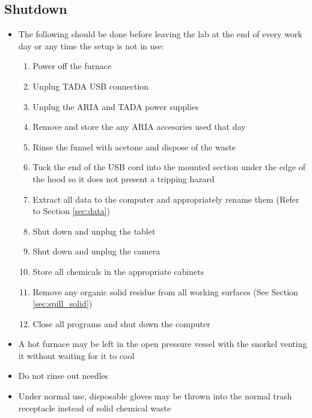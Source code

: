 \documentclass[letterpaper,11pt]{article}
\begin{document}
\subsection{Shutdown}
    \begin{itemize}
    \item The following should be done before leaving the lab at the end of 
        every work day or any time the setup is not in use:
        \begin{enumerate}
        \item Power off the furnace
        \item Unplug TADA USB connection
        \item Unplug the ARIA and TADA power supplies 
        \item Remove and store the any ARIA accesories used that day
        \item Rinse the funnel with acetone and dispose of the waste
        \item Tuck the end of the USB cord into the mounted section under the 
            edge of the hood so it does not present a tripping hazard
        \item Extract all data to the computer and appropriately rename them 
            (Refer to Section \ref{sec:data})
        \item Shut down and unplug the tablet 
        \item Shut down and unplug the camera
        \item Store all chemicals in the appropriate cabinets
        \item Remove any organic solid residue from all working surfaces 
            (See Section \ref{sec:spill_solid})
        \item Close all programs and shut down the computer
        \end{enumerate}
    
    \item A hot furnace may be left in the open pressure vessel with the snorkel 
        venting it without waiting for it to cool
    \item Do not rinse out needles %
    \item Under normal use, disposable gloves may be thrown into the normal 
        trash receptacle instead of solid chemical waste
    \end{itemize}

\newpage    
\end{document}
